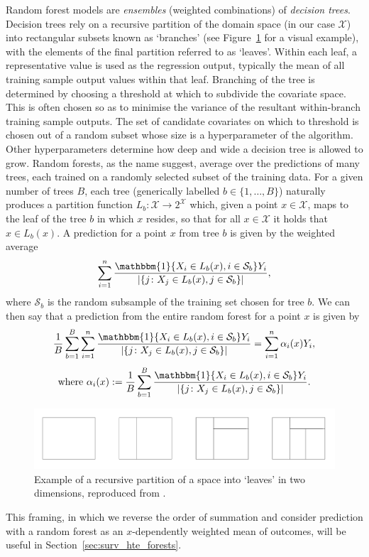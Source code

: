 \documentclass[../thesis.tex]{subfiles}
\begin{document}
Random forest models are \emph{ensembles} (weighted combinations) of \emph{decision trees}. Decision trees rely on a recursive partition of the domain space (in our case $\mathcal{X}$) into rectangular subsets known as `branches' (see Figure~\ref{fig:recursive} for a visual example), with the elements of the final partition referred to as `leaves'. Within each leaf, a representative value is used as the regression output, typically the mean of all training sample output values within that leaf. Branching of the tree is determined by choosing a threshold at which to subdivide the covariate space. This is often chosen so as to minimise the variance of the resultant within-branch training sample outputs. The set of candidate covariates on which to threshold is chosen out of a random subset whose size is a hyperparameter of the algorithm. Other hyperparameters determine how deep and wide a decision tree is allowed to grow. Random forests, as the name suggest, average over the predictions of many trees, each trained on a randomly selected subset of the training data. For a given number of trees $B$, each tree (generically labelled $b \in \{1,\dots,B\}$) naturally produces a partition function $L_b \colon \mathcal{X} \rightarrow 2^{\mathcal{X}}$ which, given a point $x \in \mathcal{X}$, maps to the leaf of the tree $b$ in which $x$ resides, so that for all $x\in \mathcal{X}$ it holds that $x \in L_b(x)$. A prediction for a point $x$ from tree $b$ is given by the weighted average
\[ \sum_{i=1}^{n} \frac{\mathbbm{1} \{X_i \in L_b(x), i \in \mathcal{S}_b\}Y_i}{|\{j \colon X_j \in L_b(x), j \in \mathcal{S}_b\}|},\]
where $\mathcal{S}_b$ is the random subsample of the training set chosen for tree $b$. We can then say that a prediction from the entire random forest for a point $x$ is given by 
\[\frac{1}{B}\sum_{b=1}^{B} \sum_{i=1}^{n} \frac{\mathbbm{1} \{X_i \in L_b(x), i \in \mathcal{S}_b\}Y_i}{|\{j \colon X_j \in L_b(x), j \in \mathcal{S}_b\}|} = \sum_{i=1}^{n} \alpha_i(x) Y_i, \]
\[ \text{where} \ \alpha_i(x) := \frac{1}{B} \sum_{b=1}^B \frac{\mathbbm{1} \{X_i \in L_b(x), i \in \mathcal{S}_b\}Y_i}{|\{j \colon X_j \in L_b(x), j \in \mathcal{S}_b\}|}.\]
\begin{figure}
    \centering
    \includegraphics[width=\textwidth]{figures/chapter4/recursive.png}
    \caption{Example of a recursive partition of a space into `leaves' in two dimensions, reproduced from \citet{reeve_adaptive_2021}.}
    \label{fig:recursive}
\end{figure}
This framing, in which we reverse the order of summation and consider prediction with a random forest as an $x$-dependently weighted mean of outcomes, will be useful in Section~\ref{sec:surv_hte_forests}. 
\end{document}
